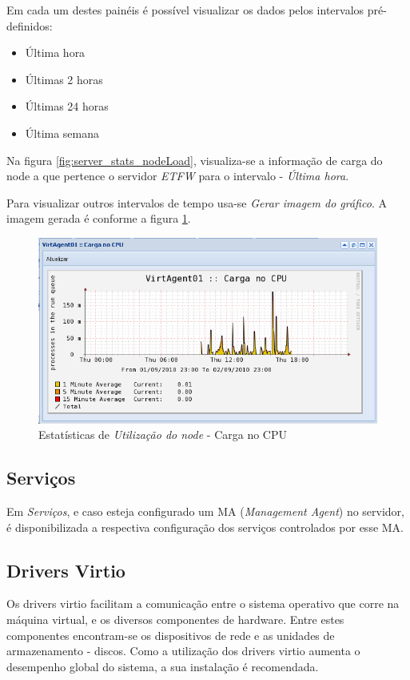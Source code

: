 Em cada um destes painéis é possível visualizar os dados pelos intervalos pré-definidos:
\begin{itemize}
	\item Última hora
	\item Últimas 2 horas
	\item Últimas 24 horas
	\item Última semana
\end{itemize}

Na figura \ref{fig:server_stats_nodeLoad}, visualiza-se a informação de carga do node a que pertence o servidor \emph{ETFW} para o intervalo - \emph{Última hora}.

Para visualizar outros intervalos de tempo usa-se \emph{Gerar imagem do gráfico}. A imagem gerada é conforme a figura \ref{fig:server_stats_nodeLoadRange}.
\begin{figure}[H]
	\begin{center}
	\includegraphics[scale=0.5]{screenshots/server_stats_nodeLoadRange.png}
	\caption{Estatísticas de \emph{Utilização do node} - Carga no CPU}
	\label{fig:server_stats_nodeLoadRange}
	\end{center}
\end{figure}

\subsection{Serviços}
Em \emph{Serviços}, e caso esteja configurado um MA (\emph{Management Agent}) no servidor, é disponibilizada a respectiva configuração dos serviços controlados por esse MA.

\subsection{Drivers Virtio}
Os drivers virtio facilitam a comunicação entre o sistema operativo que corre na máquina virtual, e os diversos componentes de hardware. Entre estes componentes encontram-se os dispositivos de rede e as unidades de armazenamento - discos. Como a utilização dos drivers virtio aumenta o desempenho global do sistema, a sua instalação é recomendada.

